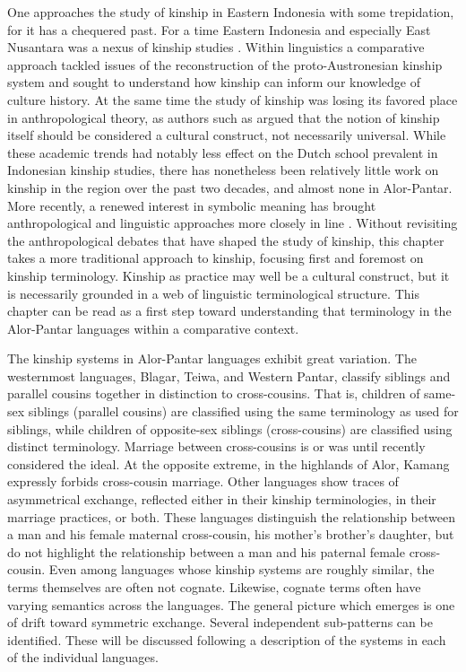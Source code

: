 One approaches the study of kinship in Eastern Indonesia with some trepidation, for it has a chequered past. For a time Eastern Indonesia and especially East Nusantara was a nexus of kinship studies \citep[see][]{Fox1980,VanWouden1968}. Within linguistics a comparative approach tackled issues of the reconstruction of the proto-Austronesian kinship system and sought to understand how kinship can inform our knowledge of culture history. At the same time the study of kinship was losing its favored place in anthropological theory, as authors such as \citet{Schneider1984} argued that the notion of kinship itself should be considered a cultural construct, not necessarily universal. While these academic trends had notably less effect on the Dutch school prevalent in Indonesian kinship studies, there has nonetheless been relatively little work on kinship in the region over the past two decades, and almost none in Alor-Pantar. More recently, a renewed interest in symbolic meaning has brought anthropological and linguistic approaches more closely in line \citep[see][]{Schweitzer2000}. Without revisiting the anthropological debates that have shaped the study of kinship, this chapter takes a more traditional approach to kinship, focusing first and foremost on kinship terminology. Kinship as practice may well be a cultural construct, but it is necessarily grounded in a web of linguistic terminological structure. This chapter can be read as a first step toward understanding that terminology in the Alor-Pantar languages within a comparative context.

The kinship systems in Alor-Pantar languages exhibit great variation. The westernmost languages, Blagar, Teiwa, and Western Pantar, classify siblings and parallel cousins together in distinction to cross-cousins. That is, children of same-sex siblings (parallel cousins) are classified using the same terminology as used for siblings, while children of opposite-sex siblings (cross-cousins) are classified using distinct terminology. Marriage between cross-cousins is or was until recently considered the ideal. At the opposite extreme, in the highlands of Alor, Kamang expressly forbids cross-cousin marriage. Other languages show traces of asymmetrical exchange, reflected either in their kinship terminologies, in their marriage practices, or both. These languages distinguish the relationship between a man and his female maternal cross-cousin, his mother's brother's daughter, but do not highlight the relationship between a man and his paternal female cross-cousin. Even among languages whose kinship systems are roughly similar, the terms themselves are often not cognate. Likewise, cognate terms often have varying semantics across the languages. The general picture which emerges is one of drift toward symmetric exchange. Several independent sub-patterns can be identified. These will be discussed following a description of the systems in each of the individual languages.

